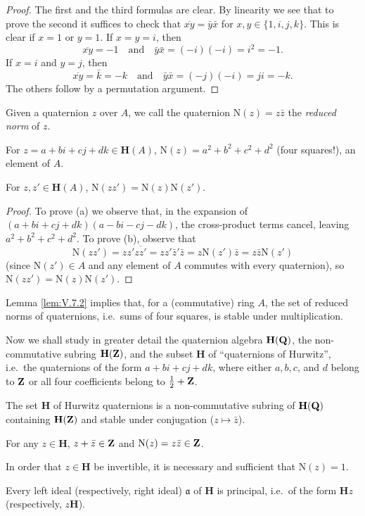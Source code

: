 \begin{proof}
The first and the third formulas are clear. By linearity we see that to
prove the second it suffices to check that
$\overline{xy}=\bar y\bar x$ for $x,y\in\{1,i,j,k\}$. This is clear if $x=1$
or $y=1$. If $x=y=i$, then
\[
\overline{xy}=-1\quad\text{and}\quad\bar y\bar x=(-i)(-i)=i^{2}=-1.
\]
If $x=i$ and $y=j$, then
\[
\overline{xy}=\bar k=-k\quad\text{and}\quad
\bar y\bar x=(-j)(-i)=ji=-k.
\]
The others follow by a permutation argument.
\end{proof}

Given a quaternion $z$ over $A$, we call the quaternion
$\mathrm{N}(z)=z\bar z$ the \emph{reduced norm} of $z$.

\begin{lemma}
\label{lem:V.7.2}
\begin{alist}
\item For $z=a+bi+cj+dk\in\mathbf{H}(A)$,
$\mathrm{N}(z)=a^{2}+b^{2}+c^{2}+d^{2}$ (four squares!), an element of $A$.
\item For $z,z'\in\mathbf{H}(A)$,
$\mathrm{N}(zz')=\mathrm{N}(z)\mathrm{N}(z')$.
\end{alist}
\end{lemma}

\begin{proof}
To prove (a) we observe that, in the expansion of
$(a+bi+cj+dk)(a-bi-cj-dk)$, the cross-product terms cancel, leaving
$a^{2}+b^{2}+c^{2}+d^{2}$. To prove (b), observe that
\[
\mathrm{N}(zz')=zz'\overline{zz'}=zz'\bar z'\bar z
=z\mathrm{N}(z')\bar z=z\bar z\mathrm{N}(z')
\]
(since $\mathrm{N}(z')\in A$ and any element of $A$ commutes with every
quaternion), so $\mathrm{N}(zz')=\mathrm{N}(z)\mathrm{N}(z')$.
\end{proof}

Lemma \ref{lem:V.7.2} implies that, for a (commutative) ring $A$, the set of
reduced norms of quaternions, i.e.\ sums of four squares, is stable under
multiplication.

Now we shall study in greater detail the quaternion algebra
$\mathbf{H}(\mathbf{Q})$, the non-commutative subring $\mathbf{H}(\mathbf{Z})$, and the
subset $\mathbf{H}$ of ``quaternions of Hurwitz'', i.e.\ the quaternions of
the form $a+bi+cj+dk$, where either $a,b,c$, and $d$ belong to $\mathbf{Z}$ or all
four coefficients belong to $\frac{1}{2}+\mathbf{Z}$.

\begin{lemma}
\label{lem:V.7.3}
\begin{alist}
\item The set $\mathbf{H}$ of Hurwitz quaternions is a non-commutative
subring of $\mathbf{H}(\mathbf{Q})$ containing $\mathbf{H}(\mathbf{Z})$ and stable under
conjugation ($z\mapsto\bar z$).
\item For any $z\in\mathbf{H}$, $z+\bar z\in\mathbf{Z}$ and
$\mathrm{N}(z)=z\bar z\in\mathbf{Z}$.
\item In order that $z\in\mathbf{H}$ be invertible, it is necessary and
sufficient that $\mathrm{N}(z)=1$.
\item Every left ideal (respectively, right ideal) $\mathfrak{a}$ of
$\mathbf{H}$ is principal, i.e.\ of the form $\mathbf{H}z$ (respectively,
$z\mathbf{H}$).
\end{alist}
\end{lemma}


